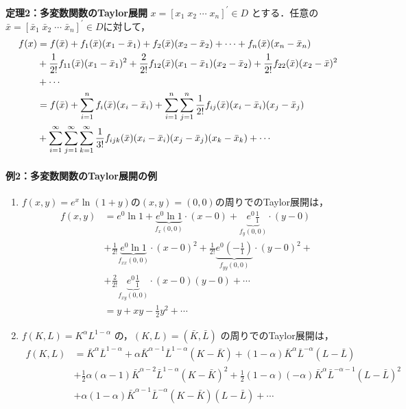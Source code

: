 \documentclass[a4paper,12pt,onecolumn,oneside,notitlepage,final]{article}
\begin{document}
\begin{itembox}[l]{{\bf 定理2：多変数関数のTaylor展開}}
$x = [x_1 \; x_2 \; \cdots \; x_n]^\prime \in D$ とする．任意の $\bar x = [\bar x_1 \; \bar x_2 \; \cdots \; \bar x_n]^\prime \in D$に対して，
\begin{align}
f(x) &= f(\bar x) + f_1(\bar x) (x_1 - \bar x_1) + f_2(\bar x) (x_2-\bar x_2) + \cdots + f_n(\bar x) (x_n-\bar x_n) \notag \\
&+\frac{1}{2!}f_{11}(\bar x) (x_1 - \bar x_1)^2 + \frac{2}{2!}f_{12}(\bar x) (x_1-\bar x_1)(x_2-\bar x_2) + \frac{1}{2!}f_{22}(\bar x) (x_2-\bar x)^2 \notag \\
&+ \cdots \notag \\
&= f(\bar x) + \sum_{i = 1}^n f_{i}(\bar x) (x_i - \bar x_i) + \sum_{i=1}^n\sum_{j=1}^n \frac{1}{2!}f_{ij}(\bar x)(x_i-\bar x_i)(x_j-\bar x_j) \notag \\
&+ \sum_{i=1}^\infty \sum_{j=1}^\infty \sum_{k=1}^\infty \frac{1}{3!}f_{ijk}(\bar x) (x_i-\bar x_i)(x_j-\bar x_j)(x_k-\bar x_k) + \cdots
\end{align}

\end{itembox}

\paragraph{例2：多変数関数のTaylor展開の例}
\begin{enumerate}
\item $f(x,y) = e^x \ln (1+y)$の$(x,y) = (0,0)$の周りでのTaylor展開は，
\begin{align*}
f(x,y) &= e^0\ln 1 + \underbrace{e^0\ln 1}_{f_x(0,0)} \cdot (x-0) + \underbrace{e^0 \frac{1}{1}}_{f_y(0,0)} \cdot (y-0) \\
&+ \frac{1}{2!}\underbrace{e^0\ln 1}_{f_{xx}(0,0)} \cdot (x-0)^2 + \frac{1}{2!} \underbrace{e^0 (-\frac{1}{1})}_{f_{yy}(0,0)} \cdot (y-0)^2 +\\
&+ \frac{2}{2!}\underbrace{e^0 \frac{1}{1}}_{f_{xy}(0,0)} \cdot (x-0)(y-0) + \cdots \\
&= y + xy -\frac{1}{2}y^2 + \cdots
\end{align*}
\item $f(K,L) = K^\alpha L^{1-\alpha}$ の，$(K, L) = (\bar K, \bar L)$ の周りでのTaylor展開は，
\begin{align*}
f(K,L) &= \bar K^\alpha \bar L^{1-\alpha} + \alpha \bar K^{\alpha-1} \bar L^{1-\alpha} (K-\bar K) + (1-\alpha) \bar K^\alpha \bar L^{-\alpha} (L-\bar L) \\
&+\frac{1}{2}\alpha (\alpha-1) \bar K^{\alpha-2} \bar L^{1-\alpha} (K-\bar K)^2  + \frac{1}{2} (1-\alpha) (-\alpha) \bar K^\alpha \bar L^{-\alpha-1} (L-\bar L)^2 \\
&+ \alpha (1-\alpha) \bar K^{\alpha-1} \bar L^{-\alpha} (K-\bar K) (L-\bar L) + \cdots
\end{align*}
\end{enumerate}
\end{document}
